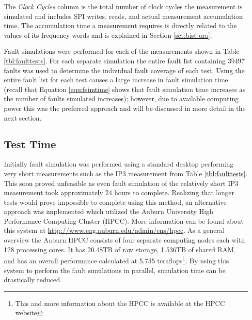 \documentclass[12pt]{report}
\begin{document}
The \textit{Clock Cycles} column is the total number of clock cycles the measurement is simulated and includes SPI writes, reads, and actual measurement accumulation time.  The accumulation time a measurement requires is directly related to the values of its frequency words and is explained in Section \ref{sct:bist-ora}.

Fault simulations were performed for each of the measurements shown in Table \ref{tbl:faulttests}.  For each separate simulation the entire fault list containing 39497 faults was used to determine the individual fault coverage of each test.  Using the entire fault list for each test causes a large increase in fault simulation time (recall that Equation \ref{equ:fsimtime} shows that fault simulation time increases as the number of faults simulated increases); however, due to available computing power this was the preferred approach and will be discussed in more detail in the next section.

\subsection{Test Time}
Initially fault simulation was performed using a standard desktop performing very short measurements such as the IP3 measurement from Table \ref{tbl:faulttests}.  This soon proved unfeasible as even fault simulation of the relatively short IP3 measurement took approximately 24 hours to complete.  Realizing that longer tests would prove impossible to complete using this method, an alternative approach was implemented which utilized the Auburn University High Performance Computing Cluster (HPCC).  More information can be found about this system at \url{http://www.eng.auburn.edu/admin/ens/hpcc}.  As a general overview the Auburn HPCC consists of four separate computing nodes each with 128 processing cores.  It has 20.48TB of raw storage, 1.536TB of shared RAM, and has an overall performance calculated at 5.735 teraflops\footnote{This and more information about the HPCC is available at the HPCC website}.  By using this system to perform the fault simulations in parallel, simulation time can be drastically reduced.
\end{document}
